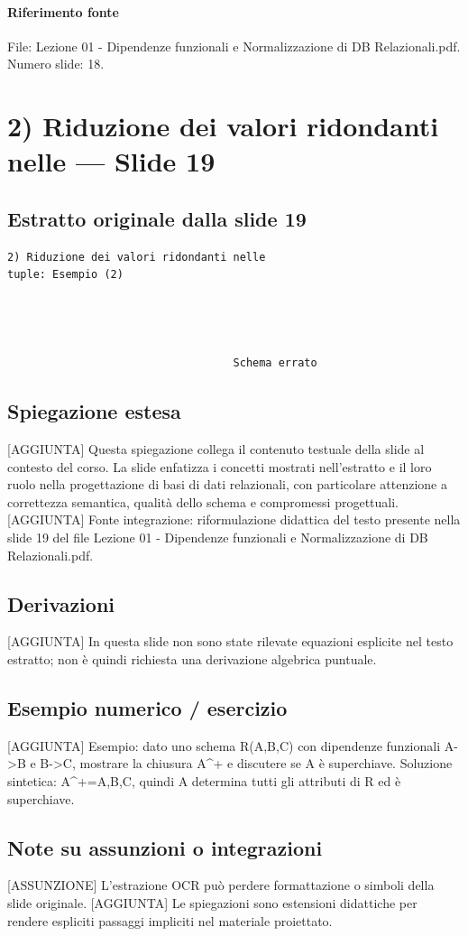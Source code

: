 \documentclass[11pt]{article}
\begin{document}
\paragraph{Riferimento fonte} File: Lezione 01 - Dipendenze funzionali e Normalizzazione di DB Relazionali.pdf. Numero slide: 18.
\section{2) Riduzione dei valori ridondanti nelle --- Slide 19}
\subsection*{Estratto originale dalla slide 19}
\begin{lstlisting}
2) Riduzione dei valori ridondanti nelle
tuple: Esempio (2)




                                   Schema errato
\end{lstlisting}
\subsection*{Spiegazione estesa}
[AGGIUNTA] Questa spiegazione collega il contenuto testuale della slide al contesto del corso. La slide enfatizza i concetti mostrati nell'estratto e il loro ruolo nella progettazione di basi di dati relazionali, con particolare attenzione a correttezza semantica, qualità dello schema e compromessi progettuali.
[AGGIUNTA] Fonte integrazione: riformulazione didattica del testo presente nella slide 19 del file Lezione 01 - Dipendenze funzionali e Normalizzazione di DB Relazionali.pdf.
\subsection*{Derivazioni}
[AGGIUNTA] In questa slide non sono state rilevate equazioni esplicite nel testo estratto; non è quindi richiesta una derivazione algebrica puntuale.
\subsection*{Esempio numerico / esercizio}
[AGGIUNTA] Esempio: dato uno schema R(A,B,C) con dipendenze funzionali A->B e B->C, mostrare la chiusura A^+ e discutere se A è superchiave. Soluzione sintetica: A^+={A,B,C}, quindi A determina tutti gli attributi di R ed è superchiave.
\subsection*{Note su assunzioni o integrazioni}
[ASSUNZIONE] L'estrazione OCR può perdere formattazione o simboli della slide originale.
[AGGIUNTA] Le spiegazioni sono estensioni didattiche per rendere espliciti passaggi impliciti nel materiale proiettato.
\end{document}
